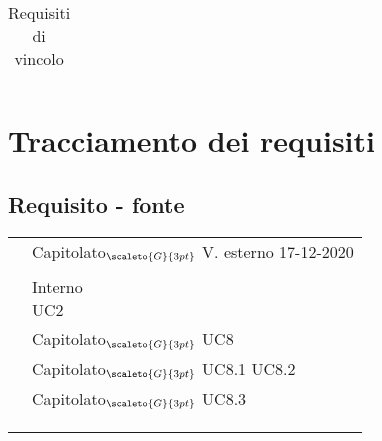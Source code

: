 {{{{\begin{center}
\begin{longtable}{|p{3cm}|p{4cm}|p{4cm}|p{4cm}|}
		\caption[Requisiti di vincolo]{Requisiti di vincolo}\label{4.4}\\
	\end{longtable}
\end{center}

\section{Tracciamento dei requisiti}\label{RequisitiTracciamentoDeiRequisiti}

\subsection{Requisito - fonte}\label{RequisitiTracciamentoDeiRequisitiFonte}

\def\tabularxcolumn#1{m{#1}}
{
	\begin{center}
		\renewcommand{\arraystretch}{1.4}
		\begin{longtable}{|p{7.5cm}|p{7.5cm}|}
		\hline
		\rowcolor{airforceblue}
		\makecell[tc]{\textbf{Codice RS}} & \makecell[c]{\textbf{Fonte}}  \\
		\hline
		\makecell[tc]{RSFO1} & \makecell[tc]{Capitolato$_{\scaleto{G}{3pt}}$\\V. esterno 17-12-2020} \\
		\hline
		\makecell[tc]{RSFF2} & \makecell[tc]{Capitolato$_{\scaleto{G}{3pt}}$}\\
		\hline
		\makecell[tc]{RSFO3} & \makecell[tc]{Interno \\ UC2}\\
		\hline
		\makecell[tc]{RSFO4} & \makecell[tc]{Capitolato$_{\scaleto{G}{3pt}}$\\UC8}\\
		\hline
		\makecell[tc]{RSFO4.1} & \makecell[tc]{Capitolato$_{\scaleto{G}{3pt}}$\\UC8.1 \\ UC8.2}\\
		\hline
		\makecell[tc]{RSFO4.2} & \makecell[tc]{Capitolato$_{\scaleto{G}{3pt}}$\\UC8.3}\\
		\hline
		\makecell[tc]{RSFO5} & \makecell[tc]{Capitolato$_{\scaleto{G}{3pt}}$}\\
		\hline
		\makecell[tc]{RSFD5.1} & \makecell[tc]{Capitolato$_{\scaleto{G}{3pt}}$}\\
		\hline
		\makecell[tc]{RSFD6}& \makecell[tc]{Capitolato$_{\scaleto{G}{3pt}}$}\\

\end{longtable}
\end{center}}}}}}
